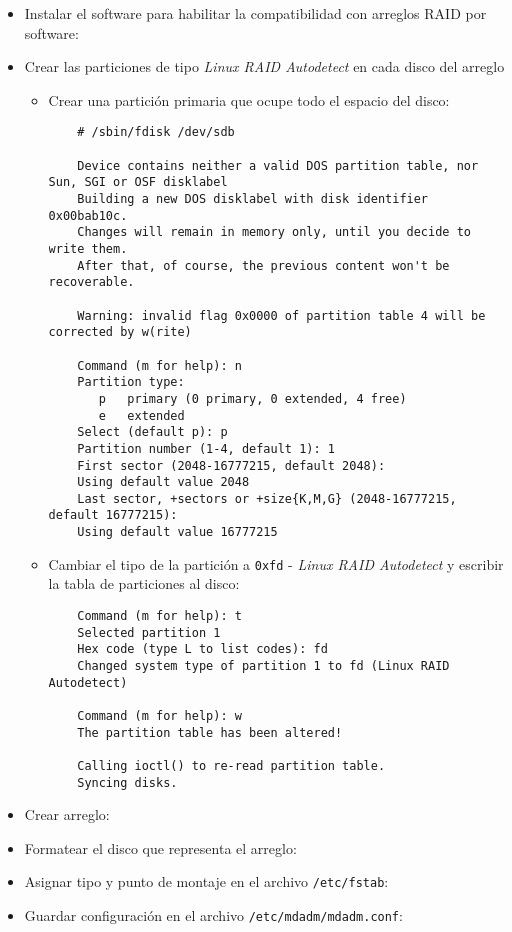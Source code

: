 \begin{itemize}
  \item Instalar el software para habilitar la compatibilidad con arreglos \textsc{RAID} por software:
  \item Crear las particiones de tipo \textit{Linux RAID Autodetect} en cada disco del arreglo
    \begin{itemize}
      \item Crear una partici\'{o}n primaria que ocupe todo el espacio del disco:

{
\scriptsize
\linespread{1}
\begin{verbatim}
    # /sbin/fdisk /dev/sdb

    Device contains neither a valid DOS partition table, nor Sun, SGI or OSF disklabel
    Building a new DOS disklabel with disk identifier 0x00bab10c.
    Changes will remain in memory only, until you decide to write them.
    After that, of course, the previous content won't be recoverable.

    Warning: invalid flag 0x0000 of partition table 4 will be corrected by w(rite)

    Command (m for help): n
    Partition type:
       p   primary (0 primary, 0 extended, 4 free)
       e   extended
    Select (default p): p
    Partition number (1-4, default 1): 1
    First sector (2048-16777215, default 2048):
    Using default value 2048
    Last sector, +sectors or +size{K,M,G} (2048-16777215, default 16777215):
    Using default value 16777215
\end{verbatim}
}

      \item Cambiar el tipo de la partici\'{o}n a \texttt{0xfd} - \textit{Linux RAID Autodetect} y escribir la tabla de particiones al disco:

{
\scriptsize
\linespread{1}
\begin{verbatim}
    Command (m for help): t
    Selected partition 1
    Hex code (type L to list codes): fd
    Changed system type of partition 1 to fd (Linux RAID Autodetect)

    Command (m for help): w
    The partition table has been altered!

    Calling ioctl() to re-read partition table.
    Syncing disks.
\end{verbatim}
}

    \end{itemize}
  \item Crear arreglo:
  \item Formatear el disco que representa el arreglo:
  \item Asignar tipo y punto de montaje en el archivo \texttt{/etc/fstab}:
  \item Guardar configuraci\'{o}n en el archivo \texttt{/etc/mdadm/mdadm.conf}:
\end{itemize}

